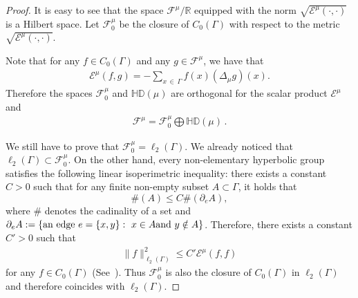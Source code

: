 \documentclass[AHL,Unicode,longabstracts,published]{cedram}
\newcommand{\ce}{\mathcal{E}}
\newcommand{\cf}{\mathcal{F}}
\newcommand{\br}{\mathbb{R}}
\newcommand{\bHD}{\mathbb{HD}}
\begin{document}
\begin{proof}
It is easy to see that the space $\cf^{\mu}/\br$ equipped with the norm $\sqrt{\ce^{\mu}(\cdot,\cdot)}$ is a Hilbert space. Let $\cf^{\mu}_0$ be the closure of $C_0(\Gamma)$ with respect to the metric $\sqrt{\ce^{\mu}(\cdot,\cdot)}$.

Note that for any $f\in C_0(\Gamma) $ and any $g\in \cf^{\mu}$, we have that
\begin{align}\label{int-part}
\ce^{\mu}(f,g)=-\sum_{x\,\in\,\Gamma}f(x)(\Delta_{\mu}g)(x).
\end{align}
Therefore the spaces $\cf^{\mu}_0$ and $\bHD(\mu)$ are orthogonal for the scalar product $\ce^\mu$ and
\begin{align*}
\cf^{\mu}=\cf^{\mu}_0\bigoplus \bHD(\mu)\,.
\end{align*}

We still have to prove that $\cf^{\mu}_0=\ell_2(\Gamma)$. We already noticed that $\ell_2(\Gamma)\subset\cf^{\mu}_0$. On the other hand, every non-elementary hyperbolic group satisfies the following linear isoperimetric inequality: there exists a constant $C>0$ such that for any finite non-empty subset $A\subset\Gamma$, it holds that
\[
\#(A)\leq C\#(\partial_eA),
\]
where $\#$ denotes the cadinality of a set and $\partial_eA:=\{\text{an edge}\ e=\{x,y\}:\ x\in A\linebreak\text{and}\ y\notin A\}$. Therefore, there exists a constant $C'>0$ such that
\begin{align}\label{P}
\|f\|_{\ell_2(\Gamma)}^2\leq C'\ce^{\mu}(f,f)
\end{align}
for any $f\in C_0(\Gamma)$ (See~\cite[Theorem~4.27]{Soa}). Thus $\cf^{\mu}_0$ is also the closure of $C_0(\Gamma)$ in $\ell_2(\Gamma)$ and therefore coincides with $\ell_2(\Gamma)$.
\end{proof}
\end{document}
